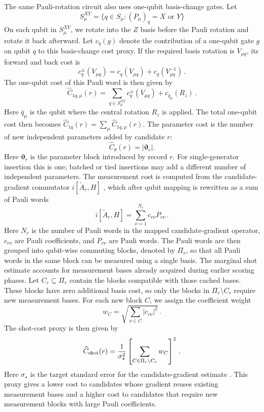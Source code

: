 \documentclass[
  reprint,
  amsmath,
  amssymb,
  aps,
  pra,
  nofootinbib,
  superscriptaddress,
  floatfix
]{revtex4-2}
\begin{document}
The same Pauli-rotation circuit also uses one-qubit basis-change gates. Let
\[
S_{\mu}^{XY} = \{q\in S_{\mu}:(P_{\mu})_q = X\text{ or }Y\}
\]
On each qubit in \(S_{\mu}^{XY}\), we rotate into the \(Z\) basis before the Pauli rotation and rotate it back afterward. Let \(c_q(g)\) denote the contribution of a one-qubit gate \(g\) on qubit \(q\) to this basis-change cost proxy. If the required basis rotation is $V_{\mu q}$, its forward and back cost is
\[
c_q^{\pm}(V_{\mu q})=c_q(V_{\mu q})+c_q(V^{-1}_{\mu q})\,.
\]
The one-qubit cost of this Pauli word is then given by
%
\begin{equation*}
\widehat{C}_{1q,\mu}(r) = \sum_{q\in S_{\mu}^{XY}}c_q^\pm(V_{\mu q}) + c_{\bar{q}_{\mu}}(R_z)\,.
\end{equation*}
Here \(\bar{q}_{\mu}\) is the qubit where the central rotation \(R_z\) is applied. The total one-qubit cost then becomes \(\widehat{C}_{1q}(r)=\sum_\mu\widehat{C}_{1q,\mu}(r)\). The parameter cost is the number of new independent parameters added by candidate \(r\):
\begin{equation*}
\widehat C_\theta(r)
=
|\boldsymbol\vartheta_r|.
\end{equation*}
%
Here \(\boldsymbol\vartheta_r\) is the parameter block introduced by record
\(r\). For single-generator insertion this is one; batched or tied insertions
may add a different number of independent parameters. The measurement cost is
computed from the candidate-gradient commutator
\(i[\widetilde A_r,H]\)
\cite{Verteletskyi2020CliqueCover,Yen2020CompatibleMeasurements}, which after
qubit mapping is rewritten as a sum of Pauli words
%
\[
i[\widetilde A_r,H]=\sum_{\nu=1}^{N_r}c_{r\nu}P_{r\nu}\,.
\]
%
Here \(N_r\) is the number of Pauli words in the mapped candidate-gradient operator, \(c_{r\nu}\) are Pauli coefficients, and \(P_{r\nu}\) are Pauli words.
The Pauli words are then grouped into qubit-wise commuting blocks, denoted by
\(\Pi_r\), so that all Pauli words in the same block can be measured using a
single basis. The marginal shot estimate accounts for measurement bases
already acquired during earlier scoring phases. Let
\(C_r\subseteq\Pi_r\) contain the blocks compatible with those cached bases.
These blocks have zero additional basis cost, so only the blocks in
\(\Pi_r\setminus C_r\) require new measurement bases.
For each new block \(C\), we assign the coefficient weight
\[
w_C = \sqrt{\sum_{\nu\in C}|c_{r\nu}|^2}\,.
\]
The shot-cost proxy is then given by
\begin{equation*}
\widehat C_{\rm shot}(r)=
\frac{1}{\sigma_\star^2}
\left[
\sum_{C\in\Pi_r\setminus C_r}
w_C
\right]^2\,.
\end{equation*}
%
Here $\sigma_\star$ is the target standard error for the candidate-gradient estimate \cite{Ikhtiarudin2025ShotEfficient}. This proxy gives a lower cost to candidates whose gradient reuses existing measurement bases and a higher cost to candidates that require new measurement blocks with large Pauli coefficients.
\end{document}
